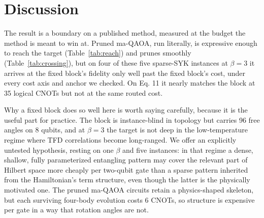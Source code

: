\documentclass[11pt]{article}
\begin{document}
\begin{table}[t]
\centering
{}
\caption[]{Every scored row of the campaign, quoted digit for digit from each experiment's  (repro package: , , , ). The engine-derived census records 3 trials and 3 promotions. Each row is scored on the metric in force when it ran; the metric changed twice, and EXP-0000 and EXP-0013 used the earlier fidelity-based metric while the later rows used Eq.~\ref{eq:score}. Rows under different metrics are not comparable.}
\label{tab:ledger}
\end{table}

\section{Discussion}

The result is a boundary on a published method, measured at the budget the method is meant to win at. Pruned ma-QAOA, run literally, is expressive enough to reach the target (Table~\ref{tab:reach}) and prunes smoothly (Table~\ref{tab:crossing}), but on four of these five sparse-SYK instances at $\beta = 3$ it arrives at the fixed block's fidelity only well past the fixed block's cost, under every cost axis and anchor we checked. On Eq. 11 it nearly matches the block at 35 logical CNOTs but not at the same routed cost.

Why a fixed block does so well here is worth saying carefully, because it is the useful part for practice. The block is instance-blind in topology but carries 96 free angles on 8 qubits, and at $\beta = 3$ the target is not deep in the low-temperature regime where TFD correlations become long-ranged. We offer an explicitly untested hypothesis, resting on one $\beta$ and five instances: in that regime a dense, shallow, fully parameterized entangling pattern may cover the relevant part of Hilbert space more cheaply per two-qubit gate than a sparse pattern inherited from the Hamiltonian's term structure, even though the latter is the physically motivated one. The pruned ma-QAOA circuits retain a physics-shaped skeleton, but each surviving four-body evolution costs 6 CNOTs, so structure is expensive per gate in a way that rotation angles are not.
\end{document}
